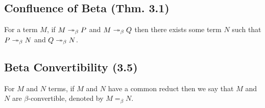 \subsection{Confluence of Beta (Thm. 3.1)}

For a term $M$, if $M \twoheadrightarrow_\beta P$ and
$M \twoheadrightarrow_\beta Q$ then there exists some
term $N$ such that $P \twoheadrightarrow_\beta N$ and
$Q \twoheadrightarrow_\beta N$.   

\subsection{Beta Convertibility (3.5)}

For $M$ and $N$ terms, if $M$ and $N$ have a common reduct then
we say that $M$ and $N$ are $\beta$-convertible, denoted by
$M =_\beta N$.